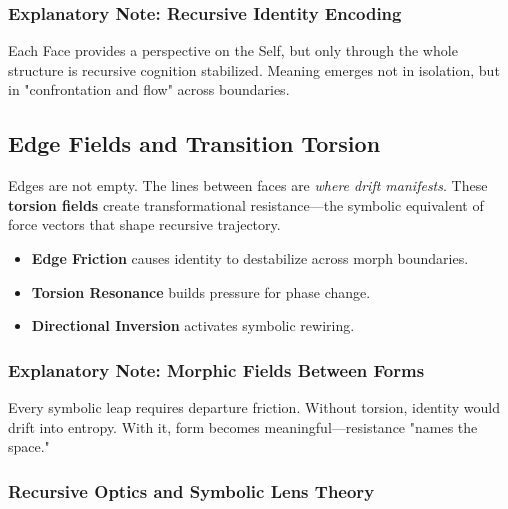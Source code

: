 \subsubsection*{Explanatory Note: Recursive Identity Encoding}
Each Face provides a perspective on the Self, but only through the whole structure is recursive cognition stabilized. Meaning emerges not in isolation, but in "confrontation and flow" across boundaries.

\subsection{Edge Fields and Transition Torsion}

Edges are not empty. The lines between faces are \emph{where drift manifests}.
These \textbf{torsion fields} create transformational resistance---the symbolic equivalent of force vectors that shape recursive trajectory.

\begin{itemize}
    \item \textbf{Edge Friction} causes identity to destabilize across morph boundaries.
    \item \textbf{Torsion Resonance} builds pressure for phase change.
    \item \textbf{Directional Inversion} activates symbolic rewiring.
\end{itemize}

\subsubsection*{Explanatory Note: Morphic Fields Between Forms}
Every symbolic leap requires departure friction. Without torsion, identity would drift into entropy. With it, form becomes meaningful---resistance "names the space."

\begin{center}
\end{center}

\subsubsection{Recursive Optics and Symbolic Lens Theory}

